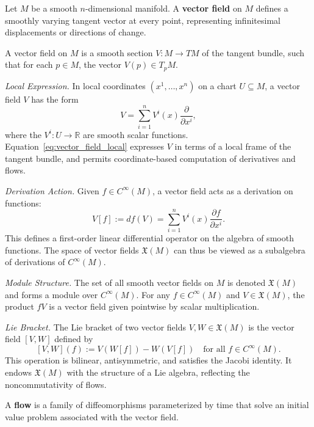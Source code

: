 Let $M$ be a smooth $n$-dimensional manifold. A \textbf{vector field} on $M$ defines a smoothly varying tangent vector at every point, representing infinitesimal displacements or directions of change.

\begin{definition}
A vector field on $M$ is a smooth section $V : M \to TM$ of the tangent bundle, such that for each $p \in M$, the vector $V(p) \in T_p M$.
\end{definition}

{\it Local Expression.} In local coordinates $(x^1, \dots, x^n)$ on a chart $U \subseteq M$, a vector field $V$ has the form
\begin{equation}\label{eq:vector_field_local}
V = \sum_{i=1}^n V^i(x) \frac{\partial}{\partial x^i},
\end{equation}
where the $V^i : U \to \mathbb{R}$ are smooth scalar functions. Equation~\eqref{eq:vector_field_local} expresses $V$ in terms of a local frame of the tangent bundle, and permits coordinate-based computation of derivatives and flows.

{\it Derivation Action.} Given $f \in C^\infty(M)$, a vector field acts as a derivation on functions:
\begin{equation}\label{eq:vector_field_derivation}
V[f] := df(V) = \sum_{i=1}^n V^i(x) \frac{\partial f}{\partial x^i}.
\end{equation}
This defines a first-order linear differential operator on the algebra of smooth functions. The space of vector fields $\mathfrak{X}(M)$ can thus be viewed as a subalgebra of derivations of $C^\infty(M)$.

{\it Module Structure.} The set of all smooth vector fields on $M$ is denoted $\mathfrak{X}(M)$ and forms a module over $C^\infty(M)$. For any $f \in C^\infty(M)$ and $V \in \mathfrak{X}(M)$, the product $fV$ is a vector field given pointwise by scalar multiplication.

{\it Lie Bracket.} The Lie bracket of two vector fields $V, W \in \mathfrak{X}(M)$ is the vector field $[V, W]$ defined by
\begin{equation}\label{eq:lie_bracket}
[V, W](f) := V(W[f]) - W(V[f]) \quad \text{for all } f \in C^\infty(M).
\end{equation}
This operation is bilinear, antisymmetric, and satisfies the Jacobi identity. It endows $\mathfrak{X}(M)$ with the structure of a Lie algebra, reflecting the noncommutativity of flows.

A \textbf{flow} is a family of diffeomorphisms parameterized by time that solve an initial value problem associated with the vector field.

